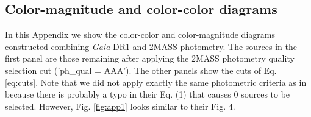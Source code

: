 \documentclass[twocolumn]{aa}
\begin{document}




\begin{appendix}
\section{Color-magnitude and color-color diagrams}
In this Appendix we show the color-color and color-magnitude diagrams constructed combining \textit{Gaia} DR1 and 2MASS photometry. The sources in the first panel  are those remaining after applying the 2MASS photometry quality selection cut ('ph\_qual = AAA'). The other panels show the cuts of Eq. \eqref{eq:cuts}. Note that we did not apply exactly the same photometric criteria as in \cite{Alves2012} because there is probably a typo in their Eq. (1) that causes 0 sources to be selected. However, Fig. \ref{fig:app1} looks similar to their Fig. 4.


\end{appendix}
\end{document}
